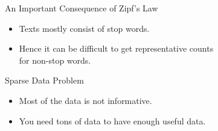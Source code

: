 \documentclass[professionalfonts, xcolor={usenames,svgnames,x11names,table}]{beamer}
\begin{document}
\begin{frame}{An Important Consequence of Zipf's Law}
    \begin{itemize}
        \item Texts mostly consist of stop words.
        \item Hence it can be difficult to get representative counts\\
            for non-stop words.
    \end{itemize}
    \begin{block}{Sparse Data Problem}
        \begin{itemize}
            \item Most of the data is not informative.
            \item You need tons of data to have enough useful data.
        \end{itemize}
    \end{block}
\end{frame}
\end{document}
